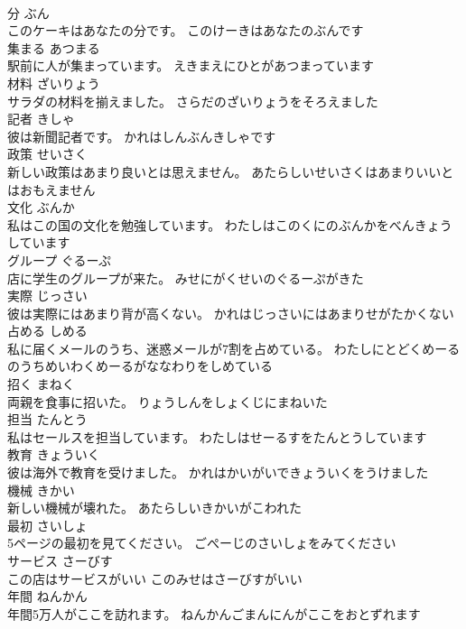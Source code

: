 \documentclass[8pt]{extreport}
\begin{document}
\begin{CJK}{UTF8}{min}
\\	分	ぶん	
\\	このケーキはあなたの分です。	このけーきはあなたのぶんです	
\\	集まる	あつまる	
\\	駅前に人が集まっています。	えきまえにひとがあつまっています	
\\	材料	ざいりょう	
\\	サラダの材料を揃えました。	さらだのざいりょうをそろえました	
\\	記者	きしゃ	
\\	彼は新聞記者です。	かれはしんぶんきしゃです	
\\	政策	せいさく	
\\	新しい政策はあまり良いとは思えません。	あたらしいせいさくはあまりいいとはおもえません	
\\	文化	ぶんか	
\\	私はこの国の文化を勉強しています。	わたしはこのくにのぶんかをべんきょうしています	
\\	グループ	ぐるーぷ	
\\	店に学生のグループが来た。	みせにがくせいのぐるーぷがきた	
\\	実際	じっさい	
\\	彼は実際にはあまり背が高くない。	かれはじっさいにはあまりせがたかくない	
\\	占める	しめる	
\\	私に届くメールのうち、迷惑メールが7割を占めている。	わたしにとどくめーるのうちめいわくめーるがななわりをしめている	
\\	招く	まねく	
\\	両親を食事に招いた。	りょうしんをしょくじにまねいた	
\\	担当	たんとう	
\\	私はセールスを担当しています。	わたしはせーるすをたんとうしています	
\\	教育	きょういく	
\\	彼は海外で教育を受けました。	かれはかいがいできょういくをうけました	
\\	機械	きかい	
\\	新しい機械が壊れた。	あたらしいきかいがこわれた	
\\	最初	さいしょ	
\\	5ページの最初を見てください。	ごぺーじのさいしょをみてください	
\\	サービス	さーびす	
\\	この店はサービスがいい	このみせはさーびすがいい	
\\	年間	ねんかん	
\\	年間5万人がここを訪れます。	ねんかんごまんにんがここをおとずれます	

\end{CJK}
\end{document}
